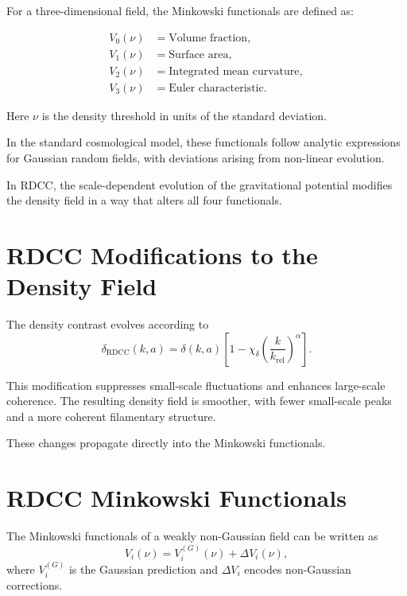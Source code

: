 \documentclass[11pt,a4paper]{article}
\begin{document}
For a three-dimensional field, the Minkowski functionals are defined as:

\begin{align}
    V_{0}(\nu) &= \text{Volume fraction}, \\
    V_{1}(\nu) &= \text{Surface area}, \\
    V_{2}(\nu) &= \text{Integrated mean curvature}, \\
    V_{3}(\nu) &= \text{Euler characteristic}.
\end{align}

Here $\nu$ is the density threshold in units of the standard deviation.

In the standard cosmological model, these functionals follow analytic expressions 
for Gaussian random fields, with deviations arising from non-linear evolution.

In RDCC, the scale-dependent evolution of the gravitational potential modifies the 
density field in a way that alters all four functionals.
\section{RDCC Modifications to the Density Field}

The density contrast evolves according to
\begin{equation}
    \delta_{\mathrm{RDCC}}(k,a)
    = \delta(k,a)
      \left[
        1 - \chi_{\delta}
        \left(\frac{k}{k_{\mathrm{rel}}}\right)^{\alpha}
      \right].
\end{equation}

This modification suppresses small-scale fluctuations and enhances large-scale 
coherence. The resulting density field is smoother, with fewer small-scale peaks 
and a more coherent filamentary structure.

These changes propagate directly into the Minkowski functionals.
\section{RDCC Minkowski Functionals}

The Minkowski functionals of a weakly non-Gaussian field can be written as
\begin{equation}
    V_{i}(\nu)
    = V_{i}^{(G)}(\nu)
      + \Delta V_{i}(\nu),
\end{equation}
where $V_{i}^{(G)}$ is the Gaussian prediction and $\Delta V_{i}$ encodes 
non-Gaussian corrections.
\end{document}
